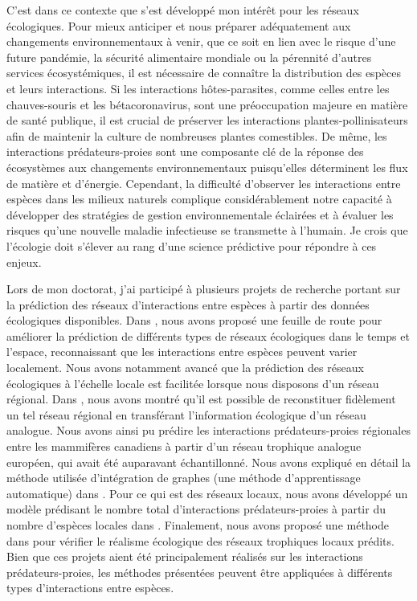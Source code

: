 \documentclass[12pt,twoside,phd]{dms}
\numberwithin{equation}{section}
\numberwithin{table}{chapter}
\numberwithin{figure}{chapter}
\begin{document}
C'est dans ce contexte que s'est développé mon intérêt pour les réseaux
écologiques. Pour mieux anticiper et nous préparer adéquatement aux changements
environnementaux à venir, que ce soit en lien avec le risque d'une future
pandémie, la sécurité alimentaire mondiale ou la pérennité d'autres services
écosystémiques, il est nécessaire de connaître la distribution des espèces et
leurs interactions. Si les interactions hôtes-parasites, comme celles entre les
chauves-souris et les bétacoronavirus, sont une préoccupation majeure en matière
de santé publique, il est crucial de préserver les interactions
plantes-pollinisateurs afin de maintenir la culture de nombreuses plantes
comestibles. De même, les interactions prédateurs-proies sont une composante clé
de la réponse des écosystèmes aux changements environnementaux puisqu'elles
déterminent les flux de matière et d'énergie. Cependant, la difficulté
d'observer les interactions entre espèces dans les milieux naturels complique
considérablement notre capacité à développer des stratégies de gestion
environnementale éclairées et à évaluer les risques qu'une nouvelle maladie
infectieuse se transmette à l'humain. Je crois que l'écologie doit s'élever au
rang d'une science prédictive pour répondre à ces enjeux.

Lors de mon doctorat, j'ai participé à plusieurs projets de recherche portant
sur la prédiction des réseaux d'interactions entre espèces à partir des données
écologiques disponibles. Dans \textcite{Strydom2021Roadmapa}, nous avons proposé
une feuille de route pour améliorer la prédiction de différents types de réseaux
écologiques dans le temps et l'espace, reconnaissant que les interactions entre
espèces peuvent varier localement. Nous avons notamment avancé que la prédiction
des réseaux écologiques à l'échelle locale est facilitée lorsque nous disposons
d'un réseau régional. Dans \textcite{Strydom2022Food}, nous avons montré qu'il
est possible de reconstituer fidèlement un tel réseau régional en transférant
l'information écologique d'un réseau analogue. Nous avons ainsi pu prédire les
interactions prédateurs-proies régionales entre les mammifères canadiens à
partir d'un réseau trophique analogue européen, qui avait été auparavant
échantillonné. Nous avons expliqué en détail la méthode utilisée d'intégration
de graphes (une méthode d'apprentissage automatique) dans
\textcite{Strydom2023Grapha}. Pour ce qui est des réseaux locaux, nous avons
développé un modèle prédisant le nombre total d'interactions prédateurs-proies à
partir du nombre d'espèces locales dans \textcite{MacDonald2020Revisiting}.
Finalement, nous avons proposé une méthode dans \textcite{Higino2023Mismatch}
pour vérifier le réalisme écologique des réseaux trophiques locaux prédits. Bien
que ces projets aient été principalement réalisés sur les interactions
prédateurs-proies, les méthodes présentées peuvent être appliquées à différents
types d'interactions entre espèces. 
\end{document}
